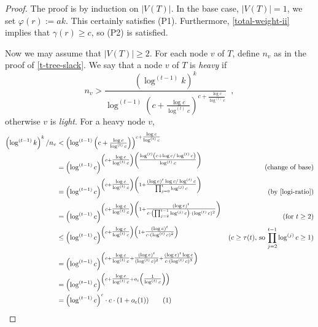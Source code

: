 \documentclass[kpfonts]{patmorin}
\newcommand\numberthis{\addtocounter{equation}{1}\tag{\theequation}}
\theoremstyle{named}
\begin{document}
\begin{proof}
    The proof is by induction on $|V(T)|$. In the base case, $|V(T)|=1$, we set $\varphi(r):=ak$.  This certainly satisfies (P1).  Furthermore, \cref{total-weight-ii} implies that $\gamma(r)\ge c$, so (P2) is satisfied.

    Now we may assume that $|V(T)|\ge 2$.  For each node $v$ of $T$, define $n_v$ as in the proof of \cref{t-tree-slack}.   We say that a node $v$ of $T$ is \emph{heavy} if
    \[
        n_v> \frac{\left(\log^{(t-1)} k\right)^k}{\log^{(t-1)}\left(c+\tfrac{\log c}{\log^{(t)} c}\right)^{c+\tfrac{\log c}{\log^{(t)} c}}} \enspace ,
    \]
    otherwise $v$ is \emph{light}.  For a heavy node $v$,
    \begin{align*}
        \left(\log^{(t-1)} k\right)^k/n_v
        & < \left(\log^{(t-1)}\left(c+\tfrac{\log c}{\log^{(t)} c}\right)\right)^{c+\tfrac{\log c}{\log^{(t)} c}} \\
        & = \left(\log^{(t-1)}c\right)^{\left(c+\tfrac{\log c}{\log^{(t)} c}\right)
        \left(\tfrac{\log^{(t)}\left(c+\log c/\log^{(t)} c\right)}{\log^{(t)} c}\right)} &\text{(change of base)} \\
        & = \left(\log^{(t-1)}c\right)^{\left(c+\tfrac{\log c}{\log^{(t)} c}\right)
        \left(
        1 + \tfrac{(\log e)^t\log c/\log^{(t)} c}{\prod_{j=0}^{t}\log^{(j)}c}
        \right)} & \text{(by \cref{logi-ratio})} \\
        & = \left(\log^{(t-1)}c\right)^{\left(c+\tfrac{\log c}{\log^{(t)} c}\right)
        \left(
        1 + \tfrac{(\log e)^t}{c\cdot\left(\prod_{j=2}^{t-1}\log^{(j)}c\right)\cdot(\log^{(t)} c)^2}
        \right)} & \text{(for $t\ge 2$)} \\
        & \le \left(\log^{(t-1)}c\right)^{\left(c+\tfrac{\log c}{\log^{(t)} c}\right)
        \left(
        1 + \tfrac{(\log e)^t}{c\cdot(\log^{(t)} c)^2}
        \right)} & \text{($c\ge \tau(t)$, so $\prod_{j=2}^{t-1}\log^{(j)}c\ge 1$)} \\
        & = \left(\log^{(t-1)}c\right)^{\left(c+\tfrac{\log c}{\log^{(t)} c}+
        \tfrac{(\log e)^t}{(\log^{(t)} c)^2} + \tfrac{(\log e)^t\log c}{c\cdot(\log^{(t)} c)^3}
        \right)}  \\
        & = \left(\log^{(t-1)}c\right)^{\left(c+\tfrac{\log c}{\log^{(t)} c}
          + o_c\left(\tfrac{1}{\log^{(t)} c}\right)
        \right)}  \\
        & = \left(\log^{(t-1)}c\right)^c \cdot c\cdot (1+o_c(1))  \numberthis \label{heavy-size}
    \end{align*}


\end{proof}
\end{document}
